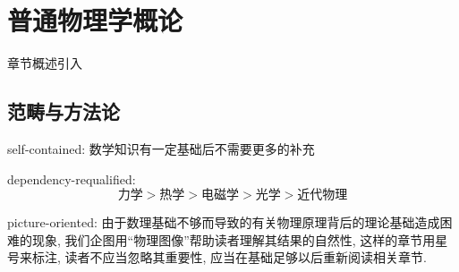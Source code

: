 \chapter{普通物理学概论}\label{1}

章节概述引入

\section{范畴与方法论}\label{1-1}

self-contained: 数学知识有一定基础后不需要更多的补充

dependency-requalified: 
\[\text{力学}>\text{热学}>\text{电磁学}>\text{光学}>\text{近代物理}\]

picture-oriented: 由于数理基础不够而导致的有关物理原理背后的理论基础造成困难的现象, 我们企图用``物理图像''帮助读者理解其结果的自然性, 这样的章节用星号来标注, 读者不应当忽略其重要性, 应当在基础足够以后重新阅读相关章节.